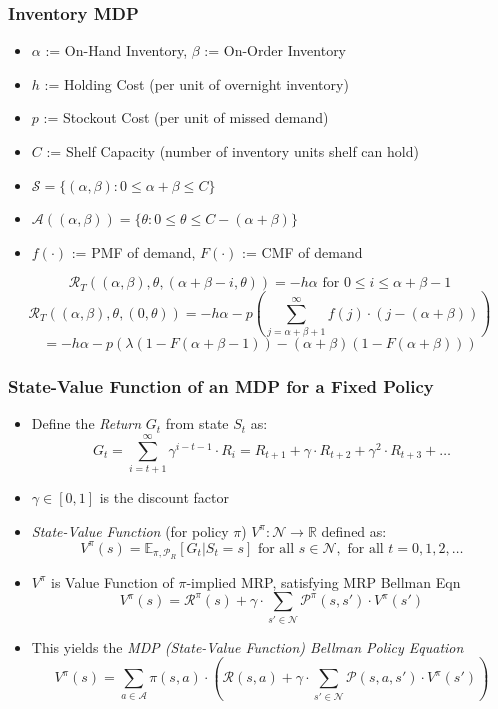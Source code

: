 \documentclass[handout]{beamer}
\begin{document}
\begin{frame}
\frametitle{Inventory MDP}
\pause
\begin{itemize}[<+->]
\item $\alpha$ := On-Hand Inventory, $\beta$ := On-Order Inventory
\item $h$ := Holding Cost (per unit of overnight inventory)
\item $p$ := Stockout Cost (per unit of missed demand)
\item $C$ := Shelf Capacity (number of inventory units shelf can hold)
\item $\mathcal{S} = \{(\alpha, \beta) : 0 \leq \alpha + \beta \leq C\}$
\item $\mathcal{A}((\alpha, \beta)) = \{\theta : 0 \leq \theta \leq C - (\alpha + \beta)\}$
\item $f(\cdot)$ := PMF of demand, $F(\cdot)$ := CMF of demand
\end{itemize}
\pause
$$\mathcal{R}_T((\alpha, \beta), \theta, (\alpha + \beta - i, \theta)) = - h \alpha \text{ for } 0 \leq i \leq \alpha + \beta - 1$$
\pause
$$\mathcal{R}_T((\alpha, \beta), \theta, (0, \theta)) = - h \alpha - p (\sum_{j=\alpha+\beta+1}^{\infty} f(j) \cdot (j - (\alpha + \beta)))$$
 $$= - h \alpha - p (\lambda (1 - F(\alpha + \beta - 1)) -  (\alpha + \beta)(1 - F(\alpha + \beta)))$$ 
\end{frame}

\begin{frame}
\frametitle{State-Value Function of an MDP for a Fixed Policy}
\pause
\begin{itemize}[<+->]
\item Define the {\em Return} $G_t$ from state $S_t$ as:
$$G_t = \sum_{i=t+1}^{\infty} \gamma^{i-t-1} \cdot R_i = R_{t+1} + \gamma \cdot R_{t+2} + \gamma^2 \cdot R_{t+3} + \ldots$$
\item $\gamma \in [0, 1]$ is the discount factor
\item {\em State-Value Function} (for policy $\pi$) $V^{\pi}: \mathcal{N} \rightarrow \mathbb{R}$ defined as:
$$V^{\pi}(s) = \mathbb{E}_{\pi, \mathcal{P}_R}[G_t|S_t=s] \text{ for all } s \in \mathcal{N}, \text{ for all } t = 0, 1, 2, \ldots$$
\item $V^{\pi}$ is Value Function of $\pi$-implied MRP, satisfying MRP Bellman Eqn
$$V^{\pi}(s) = \mathcal{R}^{\pi}(s) + \gamma \cdot \sum_{s' \in \mathcal{N}} \mathcal{P}^{\pi}(s,s') \cdot V^{\pi}(s')$$
\item This yields the {\em MDP (State-Value Function) Bellman Policy Equation}
\begin{equation}
V^{\pi}(s) = \sum_{a\in \mathcal{A}} \pi(s,a) \cdot (\mathcal{R}(s,a) + \gamma \cdot \sum_{s'\in \mathcal{N}} \mathcal{P}(s,a,s') \cdot V^{\pi}(s'))
\label{eq:mdp_bellman_policy_eqn_vv}
\end{equation}
\end{itemize}
\end{frame}
\end{document}
